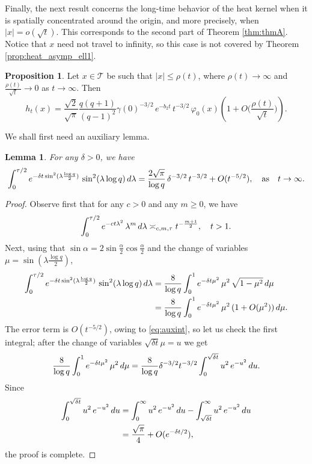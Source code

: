 \documentclass[10pt,a4paper]{amsart}
\renewcommand\mathcal{\mathscr}
\def\int{\intop\nolimits}
\theoremstyle{plain}
\newtheorem{lemma}[theorem]{Lemma}
\theoremstyle{remark}
\theoremstyle{definition}
\newtheorem{proposition}[theorem]{Proposition}
\begin{document}
	\bigskip
	
	
	
	Finally, the next result concerns the long-time behavior of the heat kernel when it is spatially concentrated around the origin, and more precisely, when $|x| = o(\sqrt{t})$. This corresponds to the second part of Theorem \ref{thm:thmA}. Notice that $x$ need not travel to infinity, so this case is not covered by Theorem \ref{prop:heat_asymp_ell1}.
	
	\begin{proposition}\label{prop:heat_asymp_p>2} Let $x\in \mathcal{T}$ be such that $|x|\leq \rho(t)$, where $\rho(t)\to \infty$ and   $\frac{\rho(t)}{\sqrt{t}}\to 0$ as $t\to \infty.$
		Then
		\[
		h_t(x)=\frac{\sqrt{2}}{\sqrt{\pi}}\frac{q(q+1)}{(q-1)^2}\gamma(0)^{-3/2}\, e^{-b_2t}\,t^{-3/2}\, \varphi_0(x)\left(1+O\Big(\frac{\rho(t)}{\sqrt{t}}\Big)\right). 
		\]
	\end{proposition}
	
	We shall first need an auxiliary lemma.
	\begin{lemma}\label{lemma:Step5}
		For any $\delta>0$, we have 
		\[
		\int_{0}^{\tau/2} e^{-\delta t \sin^2(\lambda \frac{\log q}{2})}\,\sin^2(\lambda \log q)\, d\lambda= \frac{2\sqrt{\pi}}{\log q}\, \delta^{-3/2}\, t^{-3/2} +O(t^{-5/2}), \quad \text{as} \quad t\to \infty. 
		\]
	\end{lemma}
	\begin{proof}
		Observe first that for any $c>0$ and any $m\geq 0$, we have
		\begin{equation}\label{eq:auxint}
			\int_{0}^{\tau/2} e^{-ct\lambda^2}\, \lambda^{m}\, d\lambda \asymp_{c,m, \tau} t^{-\frac{m+1}{2}}, \quad t>1.
		\end{equation}
		Next, using that $\sin \alpha=2\sin\frac{\alpha}{2}\cos\frac{\alpha}{2} $ and the change of variables $\mu=\sin(\lambda \frac{\log q}{2})$, 
		\begin{align*}
			\int_{0}^{\tau/2} e^{-\delta t \sin^2(\lambda \frac{\log q}{2})}\,\sin^2(\lambda \log q)\, d\lambda&=\frac{8}{\log q}\int_{0}^{1} e^{-\delta t\mu^2}\,\mu^2\, \sqrt{1-\mu^2}\, d\mu\\
			&=\frac{8}{\log q}\int_{0}^{1} e^{-\delta t\mu^2}\,\mu^2\, (1+O(\mu^2)) \, d\mu.
		\end{align*}
		The error term is $O(t^{-5/2})$, owing to \eqref{eq:auxint}, so let us check the first integral; after the change of variables $\sqrt{\delta t}\mu=u$ we get
		\begin{align*}\frac{8}{\log q}\int_{0}^{1} e^{-\delta t\mu^2}\,\mu^2\, d\mu=\frac{8}{\log q}\delta^{-3/2}t^{-3/2}\int_{0}^{\sqrt{\delta t}}u^2\, e^{-u^2}\, du.
		\end{align*}
		Since
		\begin{align*}
			\int_{0}^{\sqrt{\delta t}}u^2\, e^{-u^2}\, du&=\int_0^{\infty}u^2\, e^{-u^2}\, du-\int_{\sqrt{\delta t}}^{\infty}u^2\, e^{-u^2}\, du\\
			&=\frac{\sqrt{\pi}}{4}+O(e^{-\delta t/2}),
		\end{align*}
		the proof is complete.
	\end{proof}
	
\end{document}
